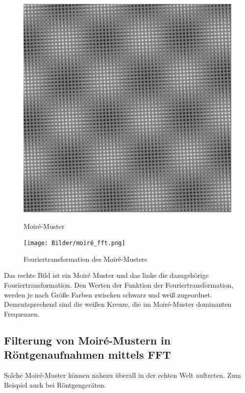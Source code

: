 \documentclass[a4paper,12pt]{article}
\theoremstyle{definition}
\theoremstyle{remark}
\begin{document}
\begin{figure}[H]
  \centering
  \begin{minipage}{0.49\textwidth}
    \centering
    \includegraphics[width=\linewidth]{Bilder/moiré.png}
    \caption{Moiré-Muster}
    \label{fig:bild1}
  \end{minipage}
  \hfill
  \begin{minipage}{0.49\textwidth}
    \centering
    \texttt{[image: Bilder/moiré\_fft.png]}
    \caption{Fouriertransformation des Moiré-Musters}
    \label{fig:bild2}
  \end{minipage}
\end{figure}

Das rechte Bild ist ein Moiré Muster und das linke die dazugehörige Fouriertransformation. Den Werten der Funktion der Fouriertransformation, werden 
je nach Größe Farben zwischen schwarz und weiß zugeordnet. Dementsprechend sind die weißen Kreuze, die im Moiré-Muster dominanten Frequenzen. 

\subsection{Filterung von Moiré-Mustern in Röntgenaufnahmen mittels FFT}

Solche Moiré-Muster können nahezu überall in der echten Welt auftreten. Zum Beispiel auch bei Röntgengeräten. 
\end{document}
